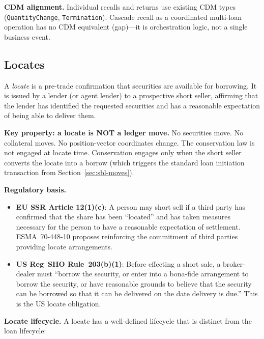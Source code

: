 \documentclass[11pt,a4paper]{article}
\begin{document}
\medskip
\noindent\textbf{CDM alignment.} Individual recalls and returns use existing CDM types (\texttt{QuantityChange}, \texttt{Termination}). Cascade recall as a coordinated multi-loan operation has no CDM equivalent (gap)---it is orchestration logic, not a single business event.

\subsection{Locates}
\label{sec:sbl-locates}

A \emph{locate} is a pre-trade confirmation that securities are available for borrowing. It is issued by a lender (or agent lender) to a prospective short seller, affirming that the lender has identified the requested securities and has a reasonable expectation of being able to deliver them.

\medskip
\noindent\textbf{Key property: a locate is NOT a ledger move.} No securities move. No collateral moves. No position-vector coordinates change. The conservation law is not engaged at locate time. Conservation engages only when the short seller converts the locate into a borrow (which triggers the standard loan initiation transaction from Section~\ref{sec:sbl-moves}).

\medskip
\noindent\textbf{Regulatory basis.}
\begin{itemize}[nosep]
\item \textbf{EU SSR Article 12(1)(c)}: A person may short sell if a third party has confirmed that the share has been ``located'' and has taken measures necessary for the person to have a reasonable expectation of settlement. ESMA~70-448-10 proposes reinforcing the commitment of third parties providing locate arrangements.
\item \textbf{US Reg~SHO Rule~203(b)(1)}: Before effecting a short sale, a broker-dealer must ``borrow the security, or enter into a bona-fide arrangement to borrow the security, or have reasonable grounds to believe that the security can be borrowed so that it can be delivered on the date delivery is due.'' This is the US locate obligation.
\end{itemize}

\medskip
\noindent\textbf{Locate lifecycle.} A locate has a well-defined lifecycle that is distinct from the loan lifecycle:
\end{document}
